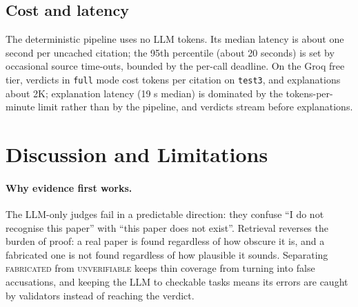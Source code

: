 \documentclass[10pt,twocolumn,a4paper]{article}
\newcommand{\verdict}[1]{\textsc{\MakeLowercase{#1}}}
\begin{document}
\subsection{Cost and latency}
The deterministic pipeline uses no LLM tokens. Its median latency is about one second per uncached
citation; the 95th percentile (about 20 seconds) is set by occasional source time-outs, bounded by the
per-call deadline. On the Groq free tier, verdicts in \texttt{full} mode cost \FullTok{} tokens per
citation on \texttt{test3}, and explanations about 2K; explanation latency (19 s median) is dominated by the
tokens-per-minute limit rather than by the pipeline, and verdicts stream before explanations.

\section{Discussion and Limitations}
\label{sec:discussion}

\paragraph{Why evidence first works.}
The LLM-only judges fail in a predictable direction: they confuse ``I do not recognise this paper''
with ``this paper does not exist''. Retrieval reverses the burden of proof: a real paper is found
regardless of how obscure it is, and a fabricated one is not found regardless of how plausible it
sounds. Separating \verdict{FABRICATED} from \verdict{UNVERIFIABLE} keeps thin coverage from turning
into false accusations, and keeping the LLM to checkable tasks means its errors are caught by
validators instead of reaching the verdict.
\end{document}
